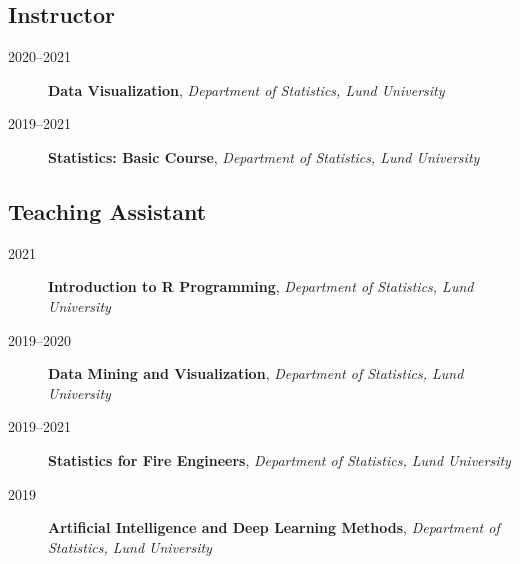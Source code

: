 \documentclass[
  10pt,
  headsepline=true,
  english,
  DIV=12
]{scrartcl}
\renewcommand*{%
  \mkbibnamegiven
}[1]{\ifitemannotation{highlight}{\textbf{#1}}{#1}}
\renewcommand*{%
  \mkbibnamefamily
}[1]{\ifitemannotation{highlight}{\textbf{#1}}{#1}}
\begin{document}
\subsection{Instructor}

\begin{description}
  \item[2020--2021]{
              \textbf{Data Visualization}, \emph{Department of Statistics, Lund
                University}
        }
  \item[2019--2021]{
              \textbf{Statistics: Basic Course}, \emph{Department of Statistics, Lund
                University}

        }
\end{description}

\subsection{Teaching Assistant}

\begin{description}

  \item[2021]{
              \textbf{Introduction to R Programming}, \emph{Department of Statistics,
                Lund University}
        }

  \item[2019--2020]{
              \textbf{Data Mining and Visualization}, \emph{Department of Statistics,
                Lund University}

        }

  \item[2019--2021]{
              \textbf{Statistics for Fire Engineers},
              \emph{Department of Statistics, Lund University}
        }

  \item[2019]{
              \textbf{Artificial Intelligence and Deep Learning Methods},
              \emph{Department of Statistics, Lund University}

        }

\end{description}
\end{document}

